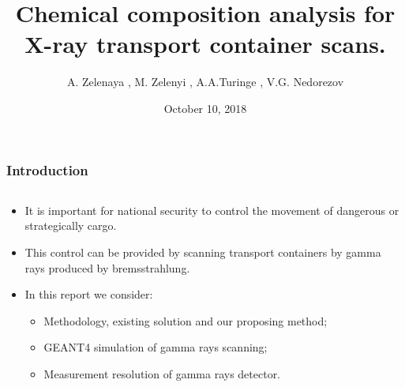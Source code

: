 \documentclass[11pt]{beamer}
\begin{document}
    \author{A. Zelenaya , M. Zelenyi , A.A.Turinge ,  V.G. Nedorezov }
    \title{Chemical composition analysis for X-ray transport container scans. }
    \date{October 10, 2018}
    \frame[plain]{\maketitle}
    
    \begin{frame}
        \frametitle{Introduction}
            \begin{columns}
            \begin{column}{0.6\textwidth}
                \begin{itemize}
                    \item It is important for national security to control the movement of dangerous or strategically cargo.
                    \item This control can be provided by scanning transport containers by gamma rays produced by bremsstrahlung.
                    \item In this report we consider:
                        \begin{itemize}
                            \item Methodology, existing solution and our proposing method;
                            \item GEANT4 simulation of gamma rays scanning;
                            \item Measurement resolution of gamma rays detector.
                        \end{itemize}
                   

\end{itemize}
\end{column}
\end{columns}
\end{frame}
\end{document}
